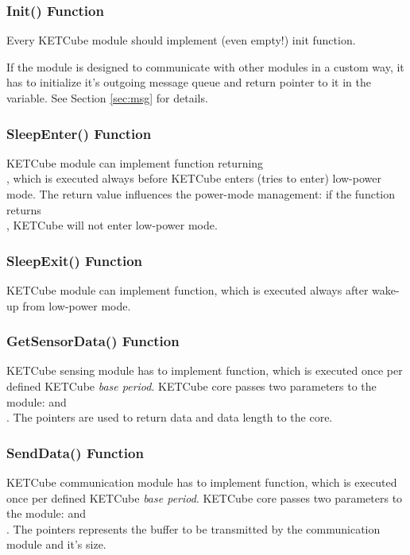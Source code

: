 \subsubsection*{Init() Function}
Every KETCube module should implement (even empty!) init function.

If the module is designed to communicate with other modules in a custom way, it has to initialize it's outgoing message queue and return pointer to it in the  variable. See Section \ref{sec:msg} for details.


\subsubsection*{SleepEnter() Function}
KETCube module can implement  function returning\\, which is executed always before KETCube enters (tries to enter) low-power mode. The return value influences the power-mode management: if the function returns\\, KETCube will not enter low-power mode.

\subsubsection*{SleepExit() Function}
KETCube module can implement  function, which is executed always after wake-up from low-power mode.

\subsubsection*{GetSensorData() Function}
KETCube sensing module has to implement  function, which is executed once per defined KETCube {\it base period}. KETCube core passes two parameters to the module:  and\\. The pointers are used to return data and data length to the core.


\subsubsection*{SendData() Function}
KETCube communication module has to implement  function, which is executed once per defined KETCube {\it base period}. KETCube core passes two parameters to the module:  and\\. The pointers represents the buffer to be transmitted by the communication module and it's size.

